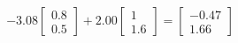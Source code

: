 \documentclass[preview]{standalone}
\begin{document}
\begin{align*}
-3.08 \begin{bmatrix} 0.8 \\ 0.5 \end{bmatrix} + 2.00 \begin{bmatrix} 1 \\ 1.6 \end{bmatrix} = \begin{bmatrix} -0.47 \\ 1.66 \end{bmatrix}
\end{align*}
\end{document}
